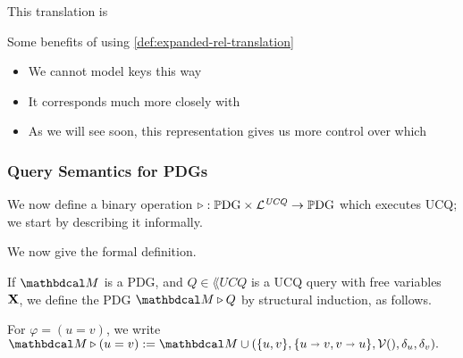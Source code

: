 \documentclass[the-pdg-manual.tex]{subfiles}
\begin{document}
This translation is

\begin{defn}\label{def:compact-rel-translation}

\end{defn}
Some benefits of using \cref{def:expanded-rel-translation}
\begin{itemize}[nosep]
	\item We cannot model keys this way
	\item It corresponds much more closely with
	\item As we will see soon, this representation gives us more control over which
\end{itemize}

\begin{defn}
\end{defn}


\subsubsection{Query Semantics for PDGs}

We now define a binary operation $\triangleright : \mathbb{P}\mathrm{DG} \times \mathcal L^{\mathit{UCQ}} \to \mathbb{P}\mathrm{DG}$ which executes UCQ; we
start by describing it informally.

We now give the formal definition.
\begin{defn}[\texorpdfstring{$\qq$}{>}]
  If $\dg M$ is a PDG, and $Q \in \lang{UCQ}$ is a UCQ query with free variables $\mathbf X$, we define the PDG $\dg M \qq Q$ by structural induction, as follows.

\begin{description}
	\item For $\varphi = (u=v)$, we write $\dg M \qq  (u = v) :=  \dg M \cup (\{u,v\}, \{u\shortrightarrow v, v\shortrightarrow u\}, \V(), \delta_{u}, \delta_{v}).$
\end{description}
\end{defn}
\end{document}

